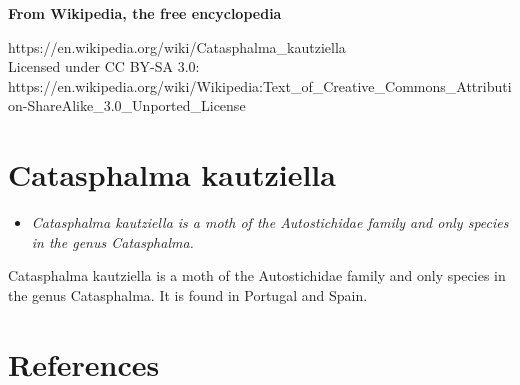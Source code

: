 \textbf{From Wikipedia, the free encyclopedia}

https://en.wikipedia.org/wiki/Catasphalma\_kautziella\\
Licensed under CC BY-SA 3.0:\\
https://en.wikipedia.org/wiki/Wikipedia:Text\_of\_Creative\_Commons\_Attribution-ShareAlike\_3.0\_Unported\_License

\section{Catasphalma kautziella}\label{catasphalma-kautziella}

\begin{itemize}
\item
  \emph{Catasphalma kautziella is a moth of the Autostichidae family and
  only species in the genus Catasphalma.}
\end{itemize}

Catasphalma kautziella is a moth of the Autostichidae family and only
species in the genus Catasphalma. It is found in Portugal and Spain.

\section{References}\label{references}
